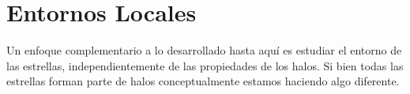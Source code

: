 



%



\section{Entornos Locales}

Un enfoque complementario a lo desarrollado hasta aqu\'i es estudiar el entorno de las estrellas, independientemente de las propiedades de los halos. Si bien todas las estrellas forman parte de halos conceptualmente estamos haciendo algo diferente. 

